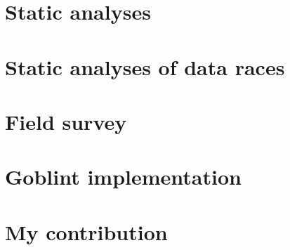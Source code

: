 \documentclass{style/master-thesis}
\begin{document}
\pagebreak


\section{Static analyses} 


\pagebreak

\section{Static analyses of data races}



\section{Field survey}


\pagebreak

\section{Goblint implementation}


\pagebreak


\section{My contribution}


\pagebreak
\end{document}
